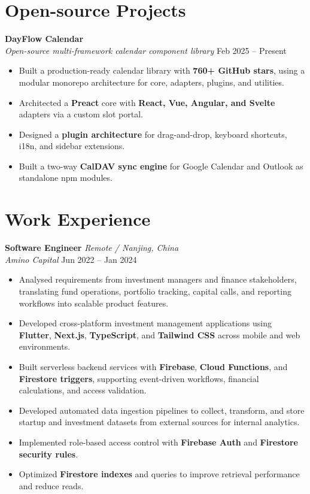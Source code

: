 \documentclass[a4paper,11pt]{article}
\newcommand{\resumeItem}[1]{\item #1}
\newcommand{\role}[4]{%
  \textbf{#1} \hfill \textit{#2}\\
  \textit{#3} \hfill #4\vspace{-2pt}
}
\newcommand{\project}[3]{%
  \textbf{#1}\\
  \textit{#2} \hfill #3\vspace{-2pt}
}
\begin{document}
\section{Open-source Projects}

\project{DayFlow Calendar}{Open-source multi-framework calendar component library}{Feb 2025 -- Present}
\begin{itemize}
\resumeItem{Built a production-ready calendar library with \textbf{760+ GitHub stars}, using a modular monorepo architecture for core, adapters, plugins, and utilities.}
  \resumeItem{Architected a \textbf{Preact} core with \textbf{React, Vue, Angular, and Svelte} adapters via a custom slot portal.}
  \resumeItem{Designed a \textbf{plugin architecture} for drag-and-drop, keyboard shortcuts, i18n, and sidebar extensions.}
  \resumeItem{Built a two-way \textbf{CalDAV sync engine} for Google Calendar and Outlook as standalone npm modules.}
\end{itemize}

\section{Work Experience}

\role{Software Engineer}{Remote / Nanjing, China}{Amino Capital}{Jun 2022 -- Jan 2024}
\begin{itemize}
  \resumeItem{Analysed requirements from investment managers and finance stakeholders, translating fund operations, portfolio tracking, capital calls, and reporting workflows into scalable product features.}
  \resumeItem{Developed cross-platform investment management applications using \textbf{Flutter}, \textbf{Next.js}, \textbf{TypeScript}, and \textbf{Tailwind CSS} across mobile and web environments.}
  \resumeItem{Built serverless backend services with \textbf{Firebase}, \textbf{Cloud Functions}, and \textbf{Firestore triggers}, supporting event-driven workflows, financial calculations, and access validation.}
  \resumeItem{Developed automated data ingestion pipelines to collect, transform, and store startup and investment datasets from external sources for internal analytics.}
\resumeItem{Implemented role-based access control with \textbf{Firebase Auth} and \textbf{Firestore security rules}.}
\resumeItem{Optimized \textbf{Firestore indexes} and queries to improve retrieval performance and reduce reads.}
\end{itemize}
\end{document}
